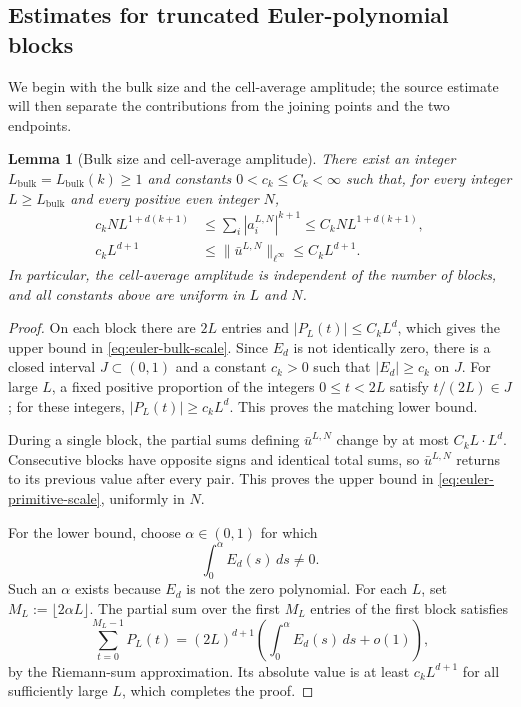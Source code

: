 \documentclass[11pt]{amsart}
\theoremstyle{plain}
\newtheorem{lemma}[theorem]{Lemma}
\theoremstyle{definition}
\theoremstyle{remark}
\numberwithin{equation}{section}
\theoremstyle{plain}
\begin{document}
\subsection{Estimates for truncated Euler-polynomial blocks}
\label{sec:euler-block-estimates}

We begin with the bulk size and the cell-average amplitude; the source
estimate will then separate the contributions from the joining points and the
two endpoints.

\begin{lemma}[Bulk size and cell-average amplitude]
	\label{lem:euler-block-scales}
	There exist an integer $L_{\mathrm{bulk}}=L_{\mathrm{bulk}}(k)\ge1$
	and constants $0<c_k\le C_k<\infty$ such that, for every integer
	$L\ge L_{\mathrm{bulk}}$ and every positive even integer $N$,
	\begin{align}
		c_kNL^{1+d(k+1)}
		&\le\sum_i|a_i^{L,N}|^{k+1}
		\le C_kNL^{1+d(k+1)},
		\label{eq:euler-bulk-scale}\\
		c_kL^{d+1}
		&\le\|\bar u^{L,N}\|_{\ell^\infty}
		\le C_kL^{d+1}.
		\label{eq:euler-primitive-scale}
	\end{align}
	In particular, the cell-average amplitude is independent of the
	number of blocks, and all constants above are uniform in $L$ and $N$.
\end{lemma}

\begin{proof}
	On each block there are $2L$ entries and
	$|P_L(t)|\le C_kL^d$, which gives the upper bound in
	\eqref{eq:euler-bulk-scale}.  Since $E_d$ is not identically zero, there
	is a closed interval $J\subset(0,1)$ and a constant $c_k>0$ such that
	$|E_d|\ge c_k$ on $J$.  For large $L$, a fixed positive proportion of the
	integers $0\le t<2L$ satisfy $t/(2L)\in J$; for these integers,
	$|P_L(t)|\ge c_kL^d$.  This proves the matching lower bound.
	
	During a single block, the partial sums defining $\bar u^{L,N}$ change by at most
	$C_kL\cdot L^d$.  Consecutive blocks have opposite signs and identical
	total sums, so $\bar u^{L,N}$ returns to its previous value after every
	pair.  This proves the upper bound in \eqref{eq:euler-primitive-scale},
	uniformly in $N$.
	
	For the lower bound, choose $\alpha\in(0,1)$ for which
	\[
	\int_0^\alpha E_d(s)\,ds\ne0.
	\]
	Such an $\alpha$ exists because $E_d$ is not the zero polynomial.  For
	each $L$, set $M_L:=\lfloor 2\alpha L\rfloor$.  The partial sum over the
	first $M_L$ entries of the first block satisfies
	\[
	\sum_{t=0}^{M_L-1}P_L(t)
	=(2L)^{d+1}
	\left(\int_0^\alpha E_d(s)\,ds+o(1)\right),
	\]
	by the Riemann-sum approximation. 
	Its absolute value is at least $c_kL^{d+1}$ for all sufficiently large $L$,
	which completes the proof.
\end{proof}
\end{document}
